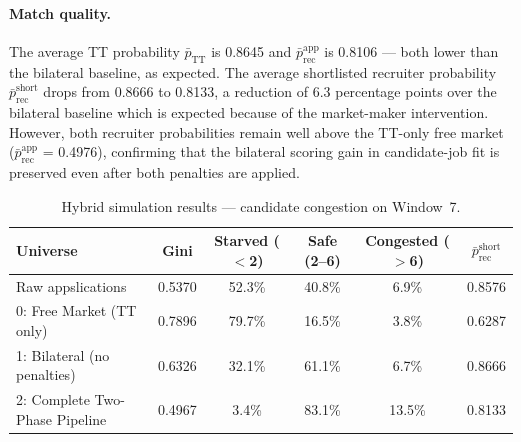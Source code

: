 \paragraph{Match quality.}
The average \gls{TT} probability $\bar{p}_\text{TT}$ is 0.8645 and 
$\bar{p}_{\text{rec}}^{\text{app}}$ is 0.8106 --- both lower than the 
bilateral baseline, as expected. The average shortlisted recruiter probability 
$\bar{p}_{\text{rec}}^{\text{short}}$ drops from 0.8666 to 0.8133, a reduction 
of 6.3 percentage points over the bilateral baseline which is expected because of the market-maker intervention. However, both recruiter probabilities 
remain well above the TT-only free market ($\bar{p}_{\text{rec}}^{\text{app}}$ 
= 0.4976), confirming that the bilateral scoring gain in candidate-job fit is 
preserved even after both penalties are applied.
 
\begin{table}[htbp]
    \centering
    \caption{Hybrid simulation results --- candidate congestion on
    Window~7.}
    \label{tab:hybrid_candidate}
    \small
    \begin{tabular}{lccccc}
        \toprule
        \textbf{Universe} & \textbf{Gini} & \textbf{Starved ($<$2)}
            & \textbf{Safe (2--6)} & \textbf{Congested ($>$6)} & $\bar{p}_{\text{rec}}^{\text{short}}$ \\
        \midrule
        Raw appslications   & 0.5370 & 52.3\% & 40.8\% & 6.9\% & 0.8576 \\
        0: Free Market (TT only)    & 0.7896 & 79.7\% & 16.5\% &  3.8\% & 0.6287 \\
        1: Bilateral (no penalties) & 0.6326 & 32.1\% & 61.1\% &  6.7\% & 0.8666 \\
        2: Complete Two-Phase Pipeline & 0.4967 &  3.4\% & 83.1\% & 13.5\% & 0.8133 \\
        \bottomrule
    \end{tabular}
\end{table}
 
